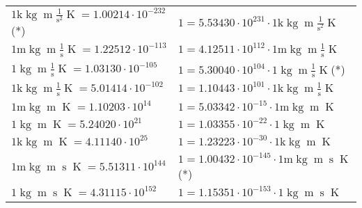 \begin{center}
\begin{longtable}{l l}
{\color{gray}$1 \bm{\mathrm{ k}}\operatorname{kg}{\operatorname{m}}\frac1{\operatorname{s}^2}{}{\operatorname{K}} = 1.00214\cdot10^{-232} $}\quad(*) & {\color{gray}$ 1 = 5.53430\cdot10^{231} \cdot 1 \bm{\mathrm{ k}}\operatorname{kg}{\operatorname{m}}\frac1{\operatorname{s}^2}{}{\operatorname{K}}$}  \\
{\color{gray}$1 \bm{\mathrm{ m}}\operatorname{kg}{\operatorname{m}}\frac1{\operatorname{s}}{}{\operatorname{K}} = 1.22512\cdot10^{-113} $}   & {\color{gray}$ 1 = 4.12511\cdot10^{112} \cdot 1 \bm{\mathrm{ m}}\operatorname{kg}{\operatorname{m}}\frac1{\operatorname{s}}{}{\operatorname{K}}$}  \\
{\color{black}$1 \bm{\mathrm{ }}\operatorname{kg}{\operatorname{m}}\frac1{\operatorname{s}}{}{\operatorname{K}} = 1.03130\cdot10^{-105} $}   & {\color{black}$ 1 = 5.30040\cdot10^{104} \cdot 1 \bm{\mathrm{ }}\operatorname{kg}{\operatorname{m}}\frac1{\operatorname{s}}{}{\operatorname{K}}$}\quad(*)\\
{\color{gray}$1 \bm{\mathrm{ k}}\operatorname{kg}{\operatorname{m}}\frac1{\operatorname{s}}{}{\operatorname{K}} = 5.01414\cdot10^{-102} $}   & {\color{gray}$ 1 = 1.10443\cdot10^{101} \cdot 1 \bm{\mathrm{ k}}\operatorname{kg}{\operatorname{m}}\frac1{\operatorname{s}}{}{\operatorname{K}}$}  \\
{\color{gray}$1 \bm{\mathrm{ m}}\operatorname{kg}{\operatorname{m}}{}{}{\operatorname{K}} = 1.10203\cdot10^{14} $}   & {\color{gray}$ 1 = 5.03342\cdot10^{-15} \cdot 1 \bm{\mathrm{ m}}\operatorname{kg}{\operatorname{m}}{}{}{\operatorname{K}}$}  \\
{\color{black}$1 \bm{\mathrm{ }}\operatorname{kg}{\operatorname{m}}{}{}{\operatorname{K}} = 5.24020\cdot10^{21} $}   & {\color{black}$ 1 = 1.03355\cdot10^{-22} \cdot 1 \bm{\mathrm{ }}\operatorname{kg}{\operatorname{m}}{}{}{\operatorname{K}}$}  \\
{\color{gray}$1 \bm{\mathrm{ k}}\operatorname{kg}{\operatorname{m}}{}{}{\operatorname{K}} = 4.11140\cdot10^{25} $}   & {\color{gray}$ 1 = 1.23223\cdot10^{-30} \cdot 1 \bm{\mathrm{ k}}\operatorname{kg}{\operatorname{m}}{}{}{\operatorname{K}}$}  \\
{\color{gray}$1 \bm{\mathrm{ m}}\operatorname{kg}{\operatorname{m}}{\operatorname{s}}{}{\operatorname{K}} = 5.51311\cdot10^{144} $}   & {\color{gray}$ 1 = 1.00432\cdot10^{-145} \cdot 1 \bm{\mathrm{ m}}\operatorname{kg}{\operatorname{m}}{\operatorname{s}}{}{\operatorname{K}}$}\quad(*)\\
{\color{black}$1 \bm{\mathrm{ }}\operatorname{kg}{\operatorname{m}}{\operatorname{s}}{}{\operatorname{K}} = 4.31115\cdot10^{152} $}   & {\color{black}$ 1 = 1.15351\cdot10^{-153} \cdot 1 \bm{\mathrm{ }}\operatorname{kg}{\operatorname{m}}{\operatorname{s}}{}{\operatorname{K}}$}  \\

\end{longtable}
\end{center}
